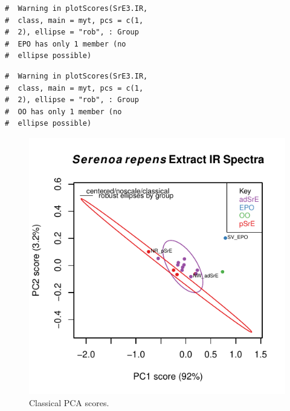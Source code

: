 \documentclass[letter,10pt,twocolumn,twoside,printwatermark=false]{pinp}
\begin{document}
\begin{ShadedResult}
\begin{verbatim}
#  Warning in plotScores(SrE3.IR,
#  class, main = myt, pcs = c(1,
#  2), ellipse = "rob", : Group
#  EPO has only 1 member (no
#  ellipse possible)
\end{verbatim}
\end{ShadedResult}
\begin{ShadedResult}
\begin{verbatim}
#  Warning in plotScores(SrE3.IR,
#  class, main = myt, pcs = c(1,
#  2), ellipse = "rob", : Group
#  OO has only 1 member (no
#  ellipse possible)
\end{verbatim}
\end{ShadedResult}
\begin{figure}

{\centering \includegraphics{ChemoSpec2_files/figure-latex/Chunk10a-1} 

}

\caption{\label{classPCA}Classical PCA scores.}\label{fig:Chunk10a}
\end{figure}

\begin{Shaded}
\begin{Highlighting}[]
\StringTok{ }
   \NormalTok{)}
   \NormalTok{(}\NormalTok{,}\NormalTok{),}
   \NormalTok{,}
   \NormalTok{)}
\end{Highlighting}
\end{Shaded}
\end{document}
